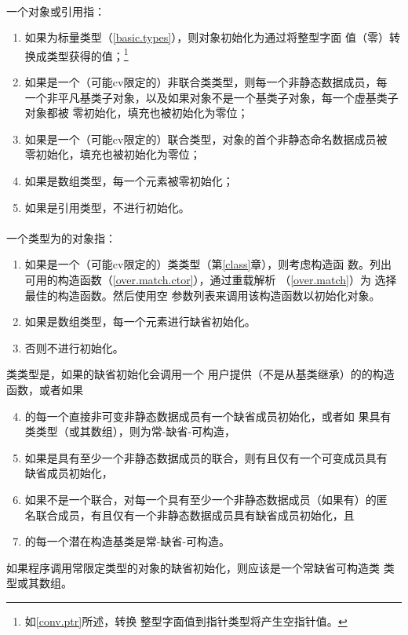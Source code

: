 \paragraph{}
一个对象或引用指：
\begin{enumerate}
  \item{如果为标量类型（\ref{basic.types}），则对象初始化为通过将整型字面
    值（零）转换成类型获得的值；\footnote{如\ref{conv.ptr}所述，转换
    整型字面值到指针类型将产生空指针值。}}
  \item{如果是一个（可能cv限定的）非联合类类型，则每一个非静态数据成员，每
    一个非平凡基类子对象，以及如果对象不是一个基类子对象，每一个虚基类子对象都被
    零初始化，填充也被初始化为零位；}
  \item{如果是一个（可能cv限定的）联合类型，对象的首个非静态命名数据成员被
    零初始化，填充也被初始化为零位；}
  \item{如果是数组类型，每一个元素被零初始化；}
  \item{如果是引用类型，不进行初始化。}
\end{enumerate}

\paragraph{}
一个类型为的对象指：
\begin{enumerate}
  \item{如果是一个（可能cv限定的）类类型（第\ref{class}章），则考虑构造函
    数。列出可用的构造函数（\ref{over.match.ctor}），通过重载解析
    （\ref{over.match}）为 \tm{()}选择最佳的构造函数。然后使用空
    参数列表来调用该构造函数以初始化对象。}
  \item{如果是数组类型，每一个元素进行缺省初始化。}
  \item{否则不进行初始化。}
\end{enumerate}

类类型是，如果的缺省初始化会调用一个
用户提供（不是从基类继承）的的构造函数，或者如果
\begin{enumerate}
  \setcounter{enumi}{3}
  \item{的每一个直接非可变非静态数据成员有一个缺省成员初始化，或者如
    果具有类类型（或其数组），则为常-缺省-可构造，}
  \item{如果是具有至少一个非静态数据成员的联合，则有且仅有一个可变成员具有
    缺省成员初始化，}
  \item{如果不是一个联合，对每一个具有至少一个非静态数据成员（如果有）的匿
    名联合成员，有且仅有一个非静态数据成员具有缺省成员初始化，且}
  \item{的每一个潜在构造基类是常-缺省-可构造。}
\end{enumerate}
如果程序调用常限定类型的对象的缺省初始化，则应该是一个常缺省可构造类
类型或其数组。

